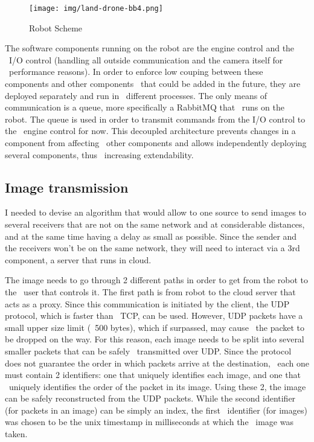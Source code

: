 \begin{figure}[ht]
    \label{fig:robot-scheme}
    \texttt{[image: img/land-drone-bb4.png]}
    \caption{Robot Scheme}
\end{figure}

The software components running on the robot are the engine control and the \
I/O control (handling all outside communication and the camera itself for \
performance reasons).
In order to enforce low couping between these components and other components \
that could be added in the future, they are deployed separately and run in \
different processes.
The only means of communication is a queue, more specifically a RabbitMQ that \
runs on the robot.
The queue is used in order to transmit commands from the I/O control to the \
engine control for now.
This decoupled architecture prevents changes in a component from affecting \
other components and allows independently deploying several components, thus \
increasing extendability.


\subsection{Image transmission}
\label{subsec:analysis-image-transmission}
 I needed to devise an algorithm that would allow to one source to send images to several receivers that are
 not on the same network and at considerable distances, and at the same time having a delay as small as possible.
 Since the sender and the receivers won't be on the same network, they will need to interact via a 3rd component,
 a server that runs in cloud.

 The image needs to go through 2 different paths in order to get from the robot to the \
user that controls it.
The first path is from robot to the cloud server that acts as a proxy.
Since this communication is initiated by the client, the UDP protocol, which is faster than \
TCP, can be used.
However, UDP packets have a small upper size limit (~500 bytes), which if surpassed, may cause \
the packet to be dropped on the way.
For this reason, each image needs to be split into several smaller packets that can be safely \
transmitted over UDP.
Since the protocol does not guarantee the order in which packets arrive at the destination, \
each one must contain 2 identifiers: one that uniquely identifies each image, and one that \
uniquely identifies the order of the packet in its image.
Using these 2, the image can be safely reconstructed from the UDP packets.
While the second identifier (for packets in an image) can be simply an index, the first \
identifier (for images) was chosen to be the unix timestamp in milliseconds at which the \
image was taken.

